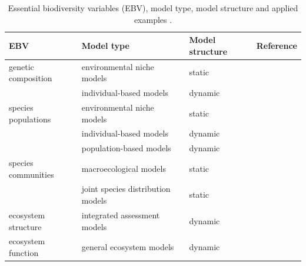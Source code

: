 \documentclass[titlesmallcaps,copyrightpage]{uomthesis}\usepackage[]{graphicx}\usepackage[]{color}
\begin{document}
\begin{table}[]
\centering
\caption{Essential biodiversity variables (EBV), model type, model structure and applied examples \citep[based on][]{zurell_spatially-explicit_2021}.}
\label{ch1:ebvmodels}
\begin{tabularx}{\textwidth}{lllY}
\toprule
EBV & Model type &  Model structure & Reference \\
\bottomrule
genetic composition & environmental niche models & static & \citep{sillero_distribution_2020} \\
 & individual-based models & dynamic & \citep{cornell_unified_2019} \\
species populations & environmental niche models & static & \citep{kapitza_assessing_2021, struebig_anticipated_2015} \\
 & individual-based models & dynamic & \citep{deangelis_individual-based_2014} \\
 & population-based models & dynamic & \citep{cadenhead_climate_2016, marshall_quantifying_2021} \\
species communities & macroecological models & static & \citep{newbold_global_2015} \\
 & joint species distribution models & static & \citep{pollock_understanding_2014} \\
ecosystem structure & integrated assessment models & dynamic & \citep{fricko_marker_2017, kriegler_fossil-fueled_2017} \\
ecosystem function & general ecosystem models & dynamic & \citep{harfoot_emergent_2014} \\
\bottomrule
\end{tabularx}
\end{table}
\end{document}
